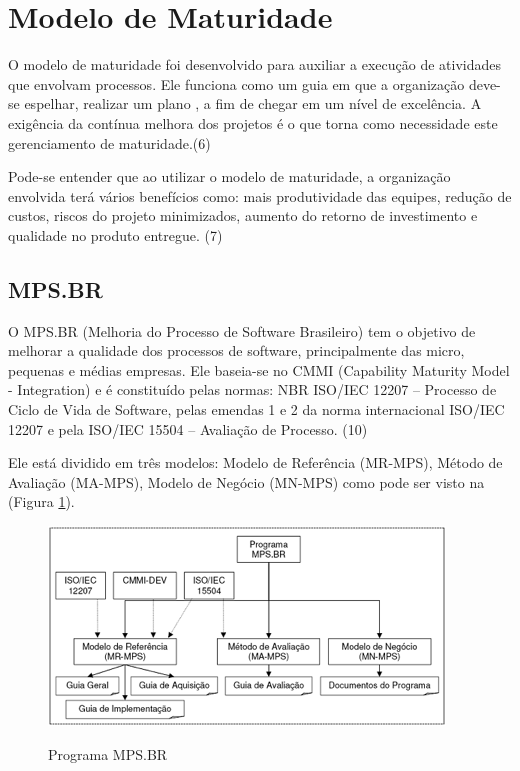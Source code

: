 \section {Modelo de Maturidade}

O modelo de maturidade foi desenvolvido para auxiliar a execução de atividades que envolvam processos. Ele funciona como um guia em que a organização deve-se  espelhar, realizar um plano , a fim de chegar em um nível de excelência. A exigência da contínua melhora dos projetos é o que torna como necessidade este gerenciamento de maturidade.(6)

Pode-se entender que ao utilizar o modelo de maturidade, a organização envolvida terá vários benefícios como: mais produtividade das equipes, redução de custos, riscos do projeto minimizados, aumento do retorno de investimento e qualidade no produto entregue. (7)

\subsection {MPS.BR}

O MPS.BR (Melhoria do Processo de Software Brasileiro) tem o objetivo de melhorar a qualidade dos processos de software, principalmente das micro, pequenas e médias empresas. Ele baseia-se no CMMI (Capability Maturity Model - Integration) e é constituído pelas normas: NBR ISO/IEC 12207 – Processo de Ciclo de Vida de Software, pelas emendas 1 e 2 da norma internacional ISO/IEC 12207 e pela ISO/IEC 15504 – Avaliação de Processo. (10)

Ele está dividido em três modelos: Modelo de Referência (MR-MPS), Método de Avaliação (MA-MPS), Modelo de Negócio (MN-MPS) como pode ser visto na (Figura \ref{img:mps2}).

\FloatBarrier
\begin{figure}[!htpd]
		\centering
		\caption{Programa MPS.BR}
		\includegraphics[scale=1.0]{figuras/mps2}
		\label{img:mps2}
\end{figure}
\FloatBarrier

